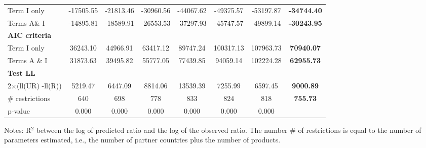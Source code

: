 \documentclass[a4paper,11pt]{article}
\begin{document}
\begin{table}[htbp]
\begin{center}
{\begin{tabular}{lccccccc}
Term I only & \multicolumn{1}{c}{-17505.55} & \multicolumn{1}{c}{-21813.46} & \multicolumn{1}{c}{-30960.56} & \multicolumn{1}{c}{-44067.62} & \multicolumn{1}{c}{-49375.57} & \multicolumn{1}{c}{-53197.87} & \textbf{-34744.40} \\
Terms A\& I & \multicolumn{1}{c}{-14895.81} & \multicolumn{1}{c}{-18589.91} & \multicolumn{1}{c}{-26553.53} & \multicolumn{1}{c}{-37297.93} & \multicolumn{1}{c}{-45747.57} & \multicolumn{1}{c}{-49899.14} & \textbf{-30243.95} \\
\textbf{AIC criteria} & \multicolumn{1}{c}{} & \multicolumn{1}{c}{} & \multicolumn{1}{c}{} &       & \multicolumn{1}{c}{} & \multicolumn{1}{c}{} & \textbf{} \\
Term I only & \multicolumn{1}{c}{36243.10} & \multicolumn{1}{c}{44966.91} & \multicolumn{1}{c}{63417.12} & \multicolumn{1}{c}{89747.24} & \multicolumn{1}{c}{100317.13} & \multicolumn{1}{c}{107963.73} & \textbf{70940.07} \\
Terms A \& I & \multicolumn{1}{c}{31873.63} & \multicolumn{1}{c}{39495.82} & \multicolumn{1}{c}{55777.05} & \multicolumn{1}{c}{77439.85} & \multicolumn{1}{c}{94059.14} & \multicolumn{1}{c}{102224.28} & \textbf{62955.73} \\
\textbf{Test LL} &       &       &       &       &       &       & \textbf{} \\
2$\times$(ll(UR) -ll(R)) & \multicolumn{1}{c}{5219.47} & \multicolumn{1}{c}{6447.09} & \multicolumn{1}{c}{8814.06} & \multicolumn{1}{c}{13539.39} & \multicolumn{1}{c}{7255.99} & \multicolumn{1}{c}{6597.45} & \textbf{9000.89} \\
\# restrictions  & \multicolumn{1}{c}{640} & \multicolumn{1}{c}{698} & \multicolumn{1}{c}{778} & \multicolumn{1}{c}{833} & \multicolumn{1}{c}{824} & \multicolumn{1}{c}{818} & \textbf{755.73} \\
p-value & \multicolumn{1}{c}{0.000} & \multicolumn{1}{c}{0.000} & \multicolumn{1}{c}{0.000} & \multicolumn{1}{c}{0.000} & \multicolumn{1}{c}{0.000} & \multicolumn{1}{c}{0.000} & \textbf{} \\
\hline\hline
\end{tabular}}%
\end{center}
 \vspace{-10pt} \tiny{Notes: R$^{2}$ between the log of predicted ratio and the log of the observed ratio. The number \# of restrictions is equal to the number of parameters estimated, i.e., the number of partner countries plus the number of products.}
\end{table}%
\end{document}
